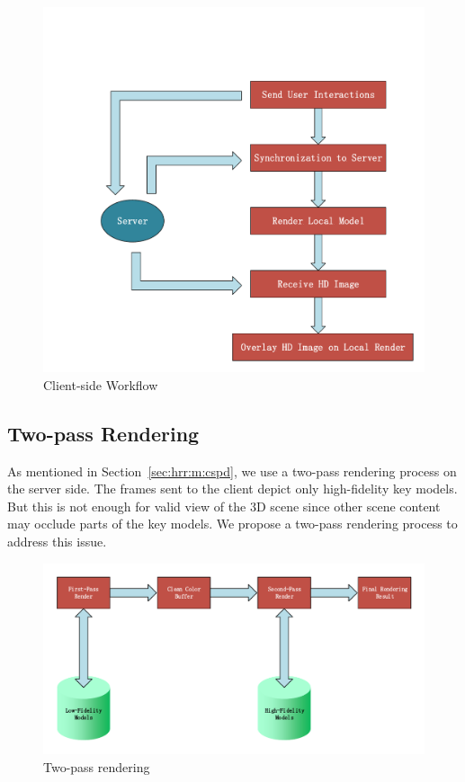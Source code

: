 \begin{figure}[!htbp]
	\includegraphics[width=\textwidth]{figures/workflow_client.pdf}
	\caption{Client-side Workflow}
	\label{fig:c-wf}
\end{figure}

\subsection{Two-pass Rendering}

As mentioned in Section~\ref{sec:hrr:m:cspd}, we use a two-pass rendering process on the server side.
The frames sent to the client depict only high-fidelity key models.
But this is not enough for valid view of the 3D scene since other scene content may occlude parts of the key models.
We propose a two-pass rendering process to address this issue.

\begin{figure}[!htbp]
	\includegraphics[width=\textwidth]{figures/two-pass-rendering.pdf}
	\caption{Two-pass rendering}
	\label{fig:tp-rendering}
\end{figure}

